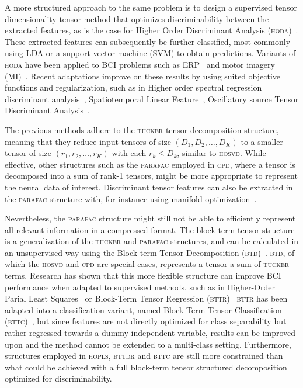 \documentclass[twocolumn]{article}
\begin{document}
A more structured approach to the same problem is to design a supervised
tensor dimensionality tensor method that optimizes discriminability between the
extracted features, as is the case for Higher Order Discriminant
Analysis (\textsc{hoda})~\cite{Yan2005,Phan2010,Froelich2018}.
These extracted features can subsequently be further classified, most commonly
using LDA or a support vector machine (SVM) to obtain predictions.
Variants of \textsc{hoda} have been applied to BCI problems such as
ERP~\cite{Onishi2012,Higashi2016} and motor imagery (MI)~\cite{Liu2015,Cai2021}.
Recent adaptations improve on these results by using suited objective
functions and regularization, such as in Higher order spectral regression
discriminant analysis~\cite{Jamshidi2017}, Spatiotemporal Linear
Feature~\cite{Aghili2023}, Oscillatory source Tensor Discriminant
Analysis~\cite{Jorajuria2022}.

The previous methods adhere to the \textsc{tucker} tensor decomposition
structure, meaning that they reduce input tensors of size
$(D_1,D_2,\ldots,D_K)$ to a smaller tensor of size $(r_1,r_2,\ldots,r_K)$ with
each $r_k\leq D_k$, similar to \textsc{hosvd}.
While effective, other structures such as the \textsc{parafac} employed in
\textsc{cpd}, where a tensor is decomposed into a sum of rank-1 tensors,
might be more appropriate to represent the neural data of interest.
Discriminant tensor features can also be extracted
in the \textsc{parafac} structure with, for instance using manifold
optimization~\cite{Froelich2018}.

Nevertheless, the \textsc{parafac} structure might still not be able to
efficiently represent all relevant information in a compressed format.
The block-term tensor structure is a generalization of the \textsc{tucker} and
\textsc{parafac} structures, and can be calculated in an unsupervised way using
the Block-term Tensor Decomposition
(\textsc{btd})~\cite{DeLathauwer2008,DeLathauwer2008a,DeLathauwer2008b,Rontogiannis2021}.
\textsc{btd}, of which the \textsc{hosvd} and \textsc{cpd} are special cases,
represents a tensor a sum of \textsc{tucker} terms.
Research has shown that this more flexible structure can improve BCI performance
when adapted to supervised methods, such as in Higher-Order Parial Least
Squares~\cite{Camarrone2018} or Block-Term Tensor Regression (\textsc{bttr})~\cite{Faes2022,Faes2022b}
\textsc{bttr} has been adapted into a classification variant, named Block-Term
Tensor Classification (\textsc{bttc})~\cite{Camarrone2021}, but since features
are not directly optimized for class separability but rather regressed towards
a dummy independent variable, results can be improved upon and the method
cannot be extended to a multi-class setting.
Furthermore, structures employed in \textsc{hopls}, \textsc{bttdr} and
\textsc{bttc} are still more constrained than what could be achieved with a
full block-term tensor structured decomposition optimized for discriminability.
\end{document}
